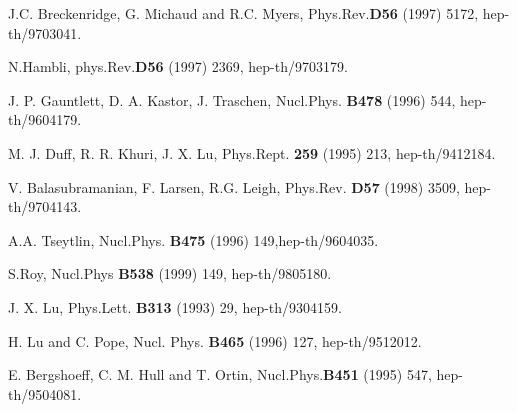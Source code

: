 \documentclass[a4paper,12pt,fleqn,cite,epsfig]{article}
\begin{document}
\begin{thebibliography}{99}
 J.C. Breckenridge, G. Michaud and
 R.C. Myers, Phys.Rev.{\bf D56} (1997) 5172, hep-th/9703041. 

 N.Hambli,  phys.Rev.{\bf D56} (1997) 2369,
 hep-th/9703179.

J. P. Gauntlett, D. A. Kastor, J. Traschen,
Nucl.Phys. {\bf B478} (1996) 544, hep-th/9604179.

  M. J. Duff, R. R. Khuri, J. X. Lu,
Phys.Rept. {\bf 259} (1995) 213, hep-th/9412184.

 V. Balasubramanian, F. Larsen, R.G. Leigh,
Phys.Rev. {\bf D57} (1998) 3509, hep-th/9704143.
 
 A.A. Tseytlin, Nucl.Phys. {\bf B475} (1996)
  149,hep-th/9604035.
 
 S.Roy, Nucl.Phys {\bf B538} (1999) 149,
 hep-th/9805180.

 J. X. Lu, Phys.Lett. {\bf B313} (1993) 29,
  hep-th/9304159.

 H. Lu and C. Pope, Nucl. Phys. {\bf B465} (1996) 127,
hep-th/9512012.

 E. Bergshoeff, C. M. Hull and T. Ortin, Nucl.Phys.{\bf B451}
(1995) 547, hep-th/9504081.


\end{thebibliography}
\end{document}
